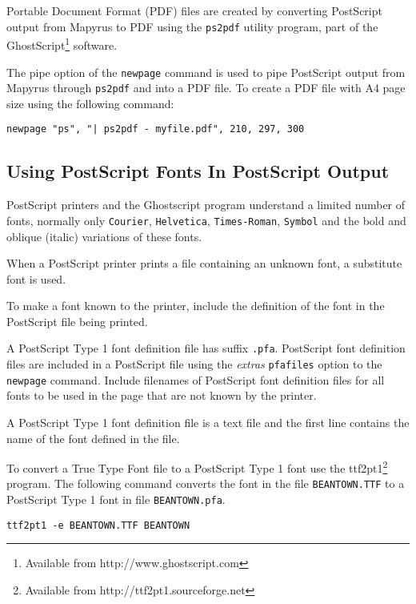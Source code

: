 Portable Document Format (PDF) files are created by converting PostScript
output from Mapyrus to PDF using the \texttt{ps2pdf} utility program, part of
the GhostScript\footnote{Available from http://www.ghostscript.com} software.

The pipe option of the \texttt{newpage} command is used to pipe PostScript
output from Mapyrus through \texttt{ps2pdf} and into a PDF file.  To create
a PDF file with A4 page size using the following command:

\begin{verbatim}
newpage "ps", "| ps2pdf - myfile.pdf", 210, 297, 300
\end{verbatim}

\subsection{Using PostScript Fonts In PostScript Output}
\label{psfonts}

PostScript printers and the Ghostscript program
understand a limited number of fonts,
normally only \texttt{Courier},
\texttt{Helvetica}, \texttt{Times-Roman}, \texttt{Symbol} and the bold
and oblique (italic) variations of these fonts.

When a PostScript printer prints a file containing an unknown font,
a substitute font is used.

To make a font known to the printer, include the definition of
the font in the PostScript file being printed.

A PostScript Type 1 font definition file has suffix \texttt{.pfa}.  PostScript
font definition files are included in a PostScript file using the
\textit{extras} \texttt{pfafiles} option to the \texttt{newpage} command.
Include filenames of PostScript font definition files for all fonts to be used
in the page that are not known by the printer.

A PostScript Type 1 font definition file is a text file and
the first line contains the name of the font defined in the file.

To convert a True Type Font file to a PostScript Type 1 font use the
ttf2pt1\footnote{Available from http://ttf2pt1.sourceforge.net} program.  The
following command converts the font in the file \texttt{BEANTOWN.TTF} to a
PostScript Type 1 font in file \texttt{BEANTOWN.pfa}.

\begin{verbatim}
ttf2pt1 -e BEANTOWN.TTF BEANTOWN
\end{verbatim}

